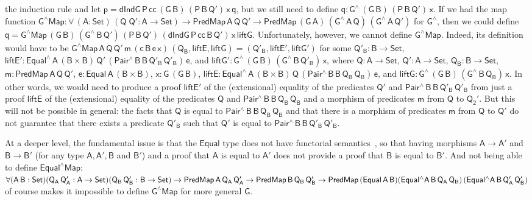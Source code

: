 \documentclass[9pt]{entcs}
\begin{document}
the induction rule and let $\mathsf{p =
  dIndG\,P\,cc\,(G\,B)\,(P\,B\,Q')\,x\,q}$, but we still need to
define $\mathsf{q : G^{\wedge}\,(G\,B)\,(P\,B\,Q')\,x}$.  If we had
the map function $\mathsf{G^\wedge Map : \forall\, (A : Set)\, (Q\;Q'
  : A \to Set) \to PredMap\,A\,Q\,Q' \to
  PredMap\,(G\,A)\,(G^{\wedge}\,A\,Q)\,(G^{\wedge}\,A\,Q')}$ for
$\mathsf{G^{\wedge}}$, then we could define $\mathsf{q = G^\wedge
  Map\,(G\,B)\,(G^{\wedge}\,B\,Q')\,(P\,B\,Q')\,
  (dIndG\,P\,cc\,B\,Q')\,x\,liftG}$.  Unfortunately, however, we
cannot define $\mathsf{G^\wedge Map}$. Indeed, its definition would
have to be $ \mathsf{G^\wedge Map\,A\,Q\,Q'\,m\,(c\,B\,e\,x)\,(Q_B,
  liftE, liftG) = (Q'_B, liftE', liftG')}$ for some $\mathsf{Q'_B : B
  \to Set}$, $\mathsf{liftE' : Equal^{\wedge}\,A\,(B \times
  B)\,Q'\,(Pair^{\wedge}\,B\,B\,Q'_B\,Q'_B)\,e}$, and $\mathsf{liftG'
  : G^{\wedge}\,(G\,B)\,(G^{\wedge}\,B\,Q'_B)\,x}$, where $\mathsf{Q :
  A \to Set}$, $\mathsf{Q' : A \to Set}$, $\mathsf{Q_B : B \to Set}$,
$\mathsf{m : PredMap\,A\,Q\,Q'}$, $\mathsf{e : Equal\,A\,(B \times
  B)}$, $\mathsf{x : G\,(G\,B)}$, $\mathsf{liftE :
  Equal^{\wedge}\,A\,(B \times
  B)\,Q\,(Pair^{\wedge}\,B\,B\,Q_B\,Q_B)\,e}$, and $\mathsf{liftG :
  G^{\wedge}\,(G\,B)\,(G^{\wedge}\,B\,Q_B)\,x}$. In other words, we
would need to produce a proof $\mathsf{liftE'}$ of the (extensional)
equality of the predicates $\mathsf{Q'}$ and
$\mathsf{Pair^{\wedge}\,B\,B\,Q'_B\,Q'_B}$ from just a proof
$\mathsf{liftE}$ of the (extensional) equality of the predicates
$\mathsf{Q}$ and $\mathsf{Pair^{\wedge}\,B\,B\,Q_B\,Q_B}$ and a
morphism of predicates $\mathsf{m}$ from $\mathsf{Q}$ to
$\mathsf{Q_2'}$.
But this will not be possible in general: the facts that $\mathsf{Q}$
is equal to $\mathsf{Pair^{\wedge}\,B\,B\,Q_B\,Q_B}$ and that there is
a morphism of predicates $\mathsf{m}$ from $\mathsf{Q}$ to
$\mathsf{Q'}$ do not guarantee that there exists a predicate
$\mathsf{Q'_B}$ such that $\mathsf{Q'}$ is equal to
$\mathsf{Pair^{\wedge}\,B\,B\,Q'_B\,Q'_B}$.

At a deeper level, the fundamental issue is that the $\mathsf{Equal}$
type does not have functorial semantics~\cite{jgj21}, so that having
morphisms $\mathsf{A \to A'}$ and $\mathsf{B \to B'}$ (for any type
$\mathsf{A, A', B}$ and $\mathsf{B'}$) and a proof that $\mathsf{A}$
is equal to $\mathsf{A'}$ does not provide a proof that $\mathsf{B}$
is equal to $\mathsf{B'}$. And not being able to define
$\mathsf{Equal^\wedge Map :}$ $\mathsf{\forall (A\, B : Set) (Q_A\,
  Q_A' : A \to Set) (Q_B\, Q_B' : B \to Set) \to PredMap\,A\,Q_A\,Q_A'
  \to PredMap\,B\,Q_B\,Q_B' \to
  PredMap\,(Equal\,A\,B)}\\ \mathsf{(Equal^\wedge
  A\,B\,Q_A\,Q_B)\,(Equal^\wedge A\,B\,Q_A'\,Q_B')}$ of course makes
it impossible to define $\mathsf{G^\wedge Map}$ for more general
$\mathsf{G}$.
\end{document}
